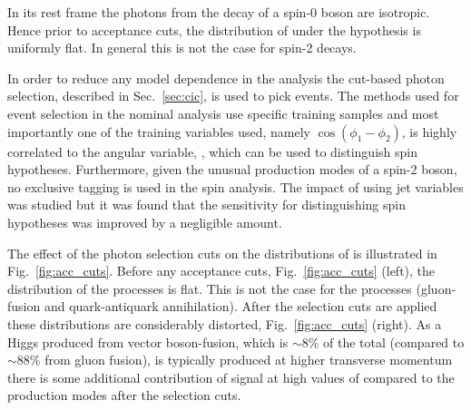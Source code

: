 In its rest frame the photons from the decay of a spin-0 boson are isotropic. Hence prior to acceptance cuts, the distribution of \costhetastar 
under the \zerop hypothesis is uniformly flat. In general this is not the case for spin-2 decays. 

In order to reduce any model dependence in the analysis the cut-based photon selection, described in Sec.~\ref{sec:cic}, is used to pick events. The \MVA methods used for event selection in the nominal analysis use specific \SM \MC training samples and most importantly one of the training variables used, namely $\cos(\phi_{1}-\phi_{2})$, is highly correlated to the angular variable, \costhetastar, which can be used to distinguish spin hypotheses. Furthermore, given the unusual production modes of a spin-2 boson, no exclusive tagging is used in the spin analysis. The impact of using jet variables was studied but it was found that the sensitivity for distinguishing spin hypotheses was improved by a negligible amount.

The effect of the photon selection cuts on the distributions of 
\abscostheta is illustrated in Fig.~\ref{fig:acc_cuts}. Before any acceptance cuts, Fig.~\ref{fig:acc_cuts} (left), the \abscostheta
distribution of the \zerop processes is flat. This is not the case for the \twomp processes (gluon-fusion and quark-antiquark annihilation). After the selection cuts are applied these distributions are considerably distorted, Fig.~\ref{fig:acc_cuts} (right). As a Higgs produced from vector boson-fusion, which is $\sim$8\% of the total (compared to $\sim$88\% from gluon fusion),  is typically produced at higher transverse momentum there is some additional contribution of \zerop signal at high values of \abscostheta compared to the \twomp production modes after the selection cuts.

